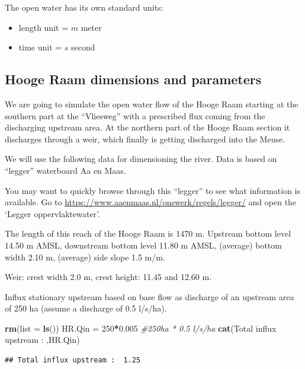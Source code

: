\documentclass[
]{article}
\newenvironment{Shaded}{\begin{snugshade}}{\end{snugshade}}
\newcommand{\AttributeTok}[1]{\textcolor[rgb]{0.13,0.29,0.53}{#1}}
\newcommand{\CommentTok}[1]{\textcolor[rgb]{0.56,0.35,0.01}{\textit{#1}}}
\newcommand{\DecValTok}[1]{\textcolor[rgb]{0.00,0.00,0.81}{#1}}
\newcommand{\FloatTok}[1]{\textcolor[rgb]{0.00,0.00,0.81}{#1}}
\newcommand{\FunctionTok}[1]{\textcolor[rgb]{0.13,0.29,0.53}{\textbf{#1}}}
\newcommand{\NormalTok}[1]{#1}
\newcommand{\OtherTok}[1]{\textcolor[rgb]{0.56,0.35,0.01}{#1}}
\newcommand{\SpecialCharTok}[1]{\textcolor[rgb]{0.81,0.36,0.00}{\textbf{#1}}}
\newcommand{\StringTok}[1]{\textcolor[rgb]{0.31,0.60,0.02}{#1}}
\providecommand{\tightlist}{%
  \setlength{\itemsep}{0pt}\setlength{\parskip}{0pt}}
\begin{document}
The open water has its own standard units:

\begin{itemize}
\tightlist
\item
  length unit = \(m\) meter
\item
  time unit = \(s\) second
\end{itemize}

\hypertarget{hooge-raam-dimensions-and-parameters}{%
\subsection{Hooge Raam dimensions and
parameters}\label{hooge-raam-dimensions-and-parameters}}

We are going to simulate the open water flow of the Hooge Raam starting
at the southern part at the ``Vliesweg'' with a prescribed flux coming
from the discharging upstream area. At the northern part of the Hooge
Raam section it discharges through a weir, which finally is getting
discharged into the Meuse.

We will use the following data for dimensioning the river. Data is based
on ``legger'' waterboard Aa en Maas.

You may want to quickly browse through this ``legger'' to see what
information is available. Go to
\url{https://www.aaenmaas.nl/onswerk/regels/legger/} and open the
`Legger oppervlaktewater'.

The length of this reach of the Hooge Raam is 1470 m. Upstream bottom
level 14.50 m AMSL, downstream bottom level 11.80 m AMSL, (average)
bottom width 2.10 m, (average) side slope 1.5 m/m.

Weir: crest width 2.0 m, crest height: 11.45 and 12.60 m.

Influx stationary upstream based on base flow as discharge of an
upstream area of 250 ha (assume a discharge of 0.5 l/s/ha).

\begin{Shaded}
\begin{Highlighting}[]
\FunctionTok{rm}\NormalTok{(}\AttributeTok{list =} \FunctionTok{ls}\NormalTok{())}
\NormalTok{HR.Qin }\OtherTok{=} \DecValTok{250}\SpecialCharTok{*}\FloatTok{0.005}  \CommentTok{\#250ha * 0.5 l/s/ha}
\FunctionTok{cat}\NormalTok{(}\StringTok{\textquotesingle{}Total influx upstream : \textquotesingle{}}\NormalTok{,HR.Qin)}
\end{Highlighting}
\end{Shaded}

\begin{verbatim}
## Total influx upstream :  1.25
\end{verbatim}
\end{document}
